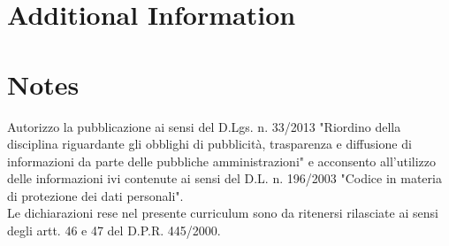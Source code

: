 \documentclass[11pt,a4paper,sans]{moderncv}
\begin{document}
  
  \section{Additional Information}
  
  \section{Notes}
  Autorizzo la pubblicazione ai sensi del D.Lgs. n. 33/2013 "Riordino della disciplina riguardante gli obblighi di pubblicità, trasparenza e diffusione di informazioni da parte delle pubbliche amministrazioni" e acconsento all’utilizzo delle informazioni ivi contenute ai sensi del D.L. n. 196/2003 "Codice in materia di protezione dei dati personali". \\
  
  Le dichiarazioni rese nel presente curriculum sono da ritenersi rilasciate ai sensi degli artt. 46 e 47 del D.P.R. 445/2000.
  
\end{document}

